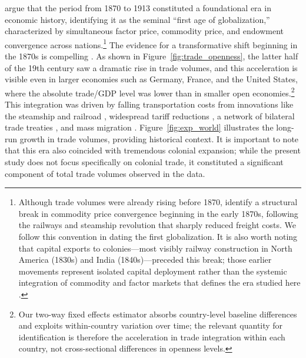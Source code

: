 \documentclass[10pt]{article}
\begin{document}
\citet{ORourke2002} argue that the period from 1870 to 1913 constituted a foundational era in economic history, identifying it as the seminal ``first age of globalization,'' characterized by simultaneous factor price, commodity price, and endowment convergence across nations.\footnote{Although trade volumes were already rising before 1870, \citet{ORourke2002} identify a structural break in commodity price convergence beginning in the early 1870s, following the railways and steamship revolution that sharply reduced freight costs. We follow this convention in dating the first globalization. It is also worth noting that capital exports to colonies---most visibly railway construction in North America (1830s) and India (1840s)---preceded this break; those earlier movements represent isolated capital deployment rather than the systemic integration of commodity and factor markets that defines the era studied here \citep{Pascali2017}.} The evidence for a transformative shift beginning in the 1870s is compelling \citep{Estevadeordal2003, KlasingMilionis2014, JacksMeissnerNovy2011, Jacks2005}. As shown in Figure~\ref{fig:trade_openness}, the latter half of the 19th century saw a dramatic rise in trade volumes, and this acceleration is visible even in larger economies such as Germany, France, and the United States, where the absolute trade/GDP level was lower than in smaller open economies.\footnote{Our two-way fixed effects estimator absorbs country-level baseline differences and exploits within-country variation over time; the relevant quantity for identification is therefore the acceleration in trade integration within each country, not cross-sectional differences in openness levels.} This integration was driven by falling transportation costs from innovations like the steamship and railroad \citep{Pascali2017}, widespread tariff reductions \citep{Jacks2005}, a network of bilateral trade treaties \citep{Lampe2009}, and mass migration \citep{TaylorWilliamson1997}. Figure~\ref{fig:exp_world} illustrates the long-run growth in trade volumes, providing historical context. It is important to note that this era also coincided with tremendous colonial expansion; while the present study does not focus specifically on colonial trade, it constituted a significant component of total trade volumes observed in the data.
\end{document}
